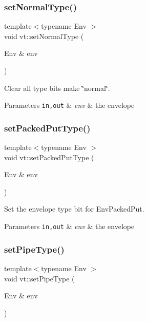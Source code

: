 \subsubsection{\texorpdfstring{set\+Normal\+Type()}{setNormalType()}}
{\footnotesize\ttfamily template$<$typename Env $>$ \\
void vt\+::set\+Normal\+Type (\begin{DoxyParamCaption}\item[{Env \&}]{env }\end{DoxyParamCaption})\hspace{0.3cm}{\ttfamily [inline]}}



Clear all type bits make \char`\"{}normal\char`\"{}. 


\begin{DoxyParams}[1]{Parameters}
\mbox{\tt in,out}  & {\em env} & the envelope \\
\hline
\end{DoxyParams}
\mbox{\label{namespacevt_a2206947364b94e9c7dba38df257d095b}} 
\subsubsection{\texorpdfstring{set\+Packed\+Put\+Type()}{setPackedPutType()}}
{\footnotesize\ttfamily template$<$typename Env $>$ \\
void vt\+::set\+Packed\+Put\+Type (\begin{DoxyParamCaption}\item[{Env \&}]{env }\end{DoxyParamCaption})\hspace{0.3cm}{\ttfamily [inline]}}



Set the envelope type bit for {\ttfamily Env\+Packed\+Put}. 


\begin{DoxyParams}[1]{Parameters}
\mbox{\tt in,out}  & {\em env} & the envelope \\
\hline
\end{DoxyParams}
\mbox{\label{namespacevt_a4ecba7a91cd1d5a6b6473cbac2042c2b}} 
\subsubsection{\texorpdfstring{set\+Pipe\+Type()}{setPipeType()}}
{\footnotesize\ttfamily template$<$typename Env $>$ \\
void vt\+::set\+Pipe\+Type (\begin{DoxyParamCaption}\item[{Env \&}]{env }\end{DoxyParamCaption})\hspace{0.3cm}{\ttfamily [inline]}}



